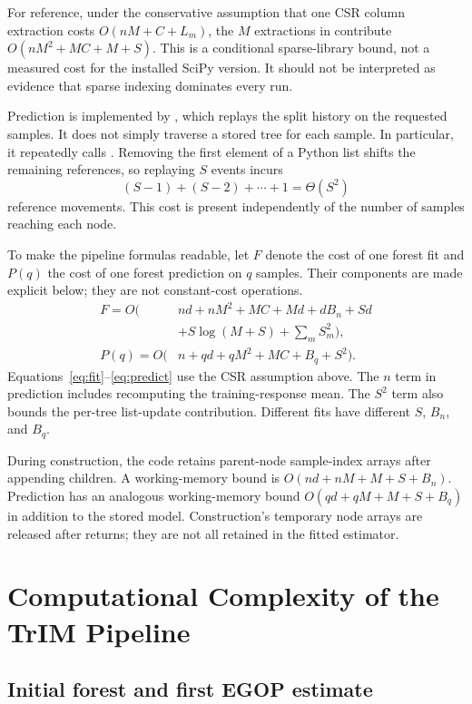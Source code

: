 \documentclass[11pt]{article}
\newcommand{\code}[1]{\texttt{\detokenize{#1}}}
\begin{document}
For reference, under the conservative assumption that one CSR column extraction costs $O(nM+C+L_m)$, the $M$ extractions in \code{train} contribute $O(nM^2+MC+M+S)$. This is a conditional sparse-library bound, not a measured cost for the installed SciPy version. It should not be interpreted as evidence that sparse indexing dominates every run.

Prediction is implemented by \code{evaluate}, which replays the split history on the requested samples. It does not simply traverse a stored tree for each sample. In particular, it repeatedly calls \code{history.pop(0)}. Removing the first element of a Python list shifts the remaining references, so replaying $S$ events incurs
\begin{equation}
(S-1)+(S-2)+\cdots+1=\Theta(S^2)
\end{equation}
reference movements. This cost is present independently of the number of samples reaching each node.

To make the pipeline formulas readable, let $F$ denote the cost of one forest fit and $P(q)$ the cost of one forest prediction on $q$ samples. Their components are made explicit below; they are not constant-cost operations.
\begin{align}
F=O\bigl(&nd+nM^2+MC+Md+dB_n+Sd \nonumber\\
         &+S\log(M+S)+\textstyle\sum_m S_m^2\bigr),\label{eq:fit}\\
P(q)=O\bigl(&n+qd+qM^2+MC+B_q+S^2\bigr).\label{eq:predict}
\end{align}
Equations~\eqref{eq:fit}--\eqref{eq:predict} use the CSR assumption above. The $n$ term in prediction includes recomputing the training-response mean. The $S^2$ term also bounds the per-tree list-update contribution. Different fits have different $S$, $B_n$, and $B_q$.

During construction, the code retains parent-node sample-index arrays after appending children. A working-memory bound is $O(nd+nM+M+S+B_n)$. Prediction has an analogous working-memory bound $O(qd+qM+M+S+B_q)$ in addition to the stored model. Construction's temporary node arrays are released after \code{train} returns; they are not all retained in the fitted estimator.

\section{Computational Complexity of the TrIM Pipeline}

\subsection{Initial forest and first EGOP estimate}
\end{document}
